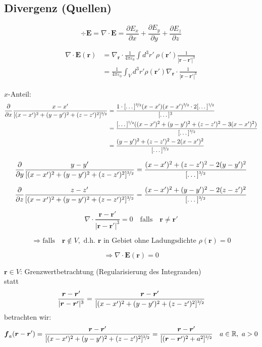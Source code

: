 \documentclass[titlepage,11pt,a4paper,ngerman]{report}
\newcommand{\prt}[2]{\frac{\partial #1}{\partial #2}}
\newcommand{\kq}{\frac{1}{4\pi\epsilon_0}}
\renewcommand{\vec}[1]{\boldsymbol{#1}}
\renewcommand{\epsilon}{\varepsilon}
\begin{document}
\subsection{Divergenz (Quellen)}

$$\div \vec{E} = \nabla \cdot \vec{E} = \prt{E_x}{x} + \prt{E_y}{y} + \prt{E_z}{z}$$

\begin{align*}
\nabla \cdot \vec{E}(\vec{r}) &= \nabla_{\vec{r}} \cdot \kq \int d^3r'\ \rho(\vec{r}') \frac{1}{|\vec{r} - \vec{r}'|^3}\\
&= \kq \int_V d^3 r' \rho (\vec{r}') \nabla_{\vec{r}} \cdot \frac{1}{|\vec{r} - \vec{r}'|^3}
\end{align*}

$x$-Anteil:
\begin{align*}
\frac{\partial}{\partial x}\frac{x-x'}{[(x-x')^2 + (y-y')^2 + (z-z')^2]^{\nicefrac{3}{2}}} &= \frac{1 \cdot [\dots]^{\nicefrac{3}{2}}(x - x')(x - x')^{\nicefrac{3}{2}}\cdot 2[\dots]^{\nicefrac{1}{2}}}{[\dots]^3}\\
&= \frac{[\dots]^{\nicefrac{1}{2}}((x - x')^2 + (y - y')^2 + (z - z')^2 - 3(x - x')^2)}{[\dots]^{\nicefrac{3}{2}}}\\
&= \frac{(y - y')^2 + (z - z')^2 - 2(x - x')^2}{[\dots]^{\nicefrac{3}{2}}}
\end{align*}

$$\frac{\partial}{\partial y} \frac{y-y'}{[(x-x')^2 + (y-y')^2 + (z-z')^2]^{\nicefrac{3}{2}}} = \frac{(x - x')^2 + (z - z')^2 - 2(y - y')^2}{[\dots]^{\nicefrac{3}{2}}}$$ 

$$\frac{\partial}{\partial z} \frac{z-z'}{[(x-x')^2 + (y-y')^2 + (z-z')^2]^{\nicefrac{3}{2}}} = \frac{(x - x')^2 + (y - y')^2 - 2(z - z')^2}{[\dots]^{\nicefrac{3}{2}}}$$ 

$$\nabla \cdot \frac{\vec{r} - \vec{r}'}{|\vec{r} - \vec{r}'|^3} = 0 \quad \textrm{falls} \quad \vec{r} \neq \vec{r}'$$

$$\Rightarrow \textrm{falls} \quad \vec{r} \notin V, \textrm{ d.h. } \vec{r} \textrm{ in Gebiet ohne Ladungsdichte } \rho(\vec{r}) = 0$$

$$\Rightarrow \nabla \cdot \vec{E}(\vec{r}) = 0$$ %


$\vec{r} \in V$: Grenzwertbetrachtung (Regularisierung des Integranden)\\
statt
$$\frac{\vec{r} - \vec{r}'}{|\vec{r} - \vec{r}'|^3} = \frac{\vec{r}-\vec{r}'}{[(x-x')^2 + (y-y')^2 + (z-z')^2]^{\nicefrac{3}{2}}}$$
betrachten wir:
$$\vec{f}_a (\vec{r}-\vec{r}') = \frac{\vec{r}-\vec{r}'}{[(x-x')^2 + (y-y')^2 + (z-z')^2]^{\nicefrac{3}{2}}} = \frac{\vec{r}-\vec{r}'}{[(\vec{r}-\vec{r}')^2 + a^2]^{\nicefrac{3}{2}}} \quad a \in \mathbb R,\ a>0$$
\end{document}
